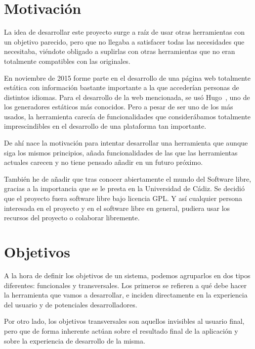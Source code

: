 \section{Motivación}

La idea de desarrollar este proyecto surge a raíz de usar otras herramientas con un objetivo
parecido, pero que no llegaba a satisfacer todas las necesidades que necesitaba, viéndote obligado
a suplirlas con otras herramientas que no eran totalmente compatibles con las originales.

En noviembre de 2015 forme parte en el desarrollo de una página web totalmente estática con información
bastante importante a la que accederían personas de distintos idiomas. Para el desarrollo de la web mencionada,
se usó Hugo~\cite{hugo}, uno de los generadores estáticos más conocidos. Pero a pesar de ser uno de los más usados,
la herramienta carecía de funcionalidades que considerábamos totalmente imprescindibles en el desarrollo
de una plataforma tan importante.

De ahí nace la motivación para intentar desarrollar una herramienta que aunque siga los mismos principios,
añada funcionalidades de las que las herramientas actuales carecen y no tiene pensado añadir en un futuro
próximo.

También he de añadir que tras conocer abiertamente el mundo del Software libre, gracias a la importancia
que se le presta en la Universidad de Cádiz. Se decidió que el proyecto fuera software libre bajo
licencia GPL. Y así cualquier persona interesada en el proyecto y en el software libre
en general, pudiera usar los recursos del proyecto o colaborar libremente.

\section{Objetivos}

A la hora de definir los objetivos de un sistema, podemos agruparlos en dos tipos
diferentes: funcionales y transversales. Los primeros se refieren a qué debe hacer
la herramienta que vamos a desarrollar, e inciden directamente en la experiencia del
usuario y de potenciales desarrolladores.

Por otro lado, los objetivos transversales son aquellos invisibles al usuario final,
pero que de forma inherente actúan sobre el resultado final de la aplicación y
sobre la experiencia de desarrollo de la misma.

